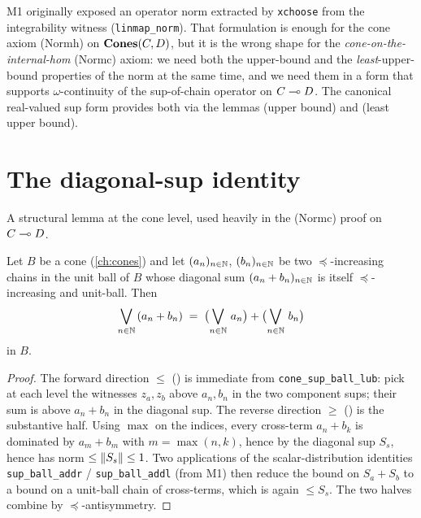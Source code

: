 \begin{remark}
M1 originally exposed an operator norm extracted by
\texttt{xchoose} from the integrability witness
(\texttt{linmap\_norm}). That formulation is enough for the cone
axiom (Normh) on $\mathbf{Cones}(C, D)$, but it is the wrong shape for the
\emph{cone-on-the-internal-hom} (Normc) axiom: we need both the
upper-bound and the \emph{least}-upper-bound properties of the
norm at the same time, and we need them in a form that supports
$\omega$-continuity of the sup-of-chain operator on $C \multimap D$.
The canonical real-valued sup form
 provides both via the lemmas
 (upper bound) and
 (least upper bound).
\end{remark}

\section{The diagonal-sup identity}\label{sec:linhom-diag-sup}

A structural lemma at the cone level, used heavily in the (Normc)
proof on $C \multimap D$.

\begin{lemma}\label{lem:cone-sup-ball-addD}
\rocqok{}
Let $B$ be a cone (\autoref{ch:cones}) and let
$(a_n)_{n \in \mathbb{N}}$, $(b_n)_{n \in \mathbb{N}}$ be two $\preceq$-increasing
chains in the unit ball of $B$ whose diagonal sum
$(a_n + b_n)_{n \in \mathbb{N}}$ is itself $\preceq$-increasing and unit-ball.
Then
\[
  \bigvee_{n \in \mathbb{N}}\,(a_n + b_n)
  \;=\;
  \bigl(\bigvee_{n \in \mathbb{N}}\,a_n\bigr) + \bigl(\bigvee_{n \in \mathbb{N}}\,b_n\bigr)
\]
in $B$.
\end{lemma}

\begin{proof}
The forward direction $\leq$
() is immediate from
\texttt{cone\_sup\_ball\_lub}: pick at each level the witnesses
$z_a, z_b$ above $a_n, b_n$ in the two component sups; their sum is
above $a_n + b_n$ in the diagonal sup. The reverse direction
$\geq$ () is the
substantive half. Using $\max$ on the indices, every cross-term
$a_n + b_k$ is dominated by $a_m + b_m$ with $m = \max(n, k)$, hence
by the diagonal sup $S_s$, hence has norm $\le \lVert S_s \rVert \le 1$.
Two applications of the scalar-distribution identities
\texttt{sup\_ball\_addr} / \texttt{sup\_ball\_addl} (from M1) then
reduce the bound on $S_a + S_b$ to a bound on a unit-ball chain of
cross-terms, which is again $\le S_s$. The two halves combine by
$\preceq$-antisymmetry.
\end{proof}

